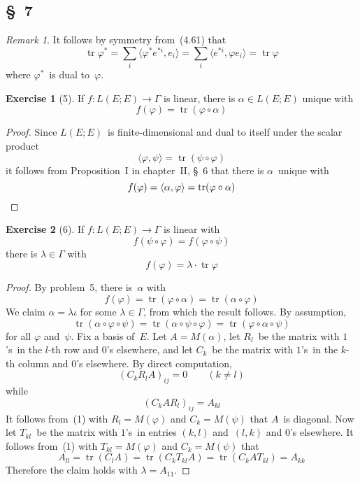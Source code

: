 \documentclass[letterpaper,12pt]{article}
\DeclareMathOperator{\tr}{tr}
\newcommand{\after}{\circ}
\newcommand{\mult}{\cdot}
\newcommand{\sprod}[2]{\langle#1,#2\rangle}
\theoremstyle{definition}
\newtheorem*{exer}{Exercise}
\theoremstyle{remark}
\newtheorem*{rmk}{Remark}
\begin{document}
\subsection*{\S~7}
\begin{rmk}
It follows by symmetry from~(4.61) that
\[\tr\varphi^*=\sum_i\sprod{\varphi^* e^{*i}}{e_i}=\sum_i\sprod{e^{*i}}{\varphi e_i}=\tr\varphi\]
where \(\varphi^*\)~is dual to~\(\varphi\).
\end{rmk}

\begin{exer}[5]
If \(f:L(E;E)\to\Gamma\) is linear, there is \(\alpha\in L(E;E)\) unique with
\[f(\varphi)=\tr(\varphi\after\alpha)\]
\end{exer}
\begin{proof}
Since \(L(E;E)\)~is finite-dimensional and dual to itself under the scalar product
\[\sprod{\varphi}{\psi}=\tr(\psi\after\varphi)\]
it follows from Proposition~I in chapter~II, \S~6 that there is \(\alpha\)~unique with
\[f(\varphi)=\sprod{\alpha}{\varphi}=\tr(\varphi\after\alpha)\qedhere\]
\end{proof}

\begin{exer}[6]
If \(f:L(E;E)\to\Gamma\) is linear with
\[f(\psi\after\varphi)=f(\varphi\after\psi)\]
there is \(\lambda\in\Gamma\) with
\[f(\varphi)=\lambda\mult\tr\varphi\]
\end{exer}
\begin{proof}
By problem~5, there is~\(\alpha\) with
\[f(\varphi)=\tr(\varphi\after\alpha)=\tr(\alpha\after\varphi)\]
We claim \(\alpha=\lambda\iota\) for some \(\lambda\in\Gamma\), from which the result follows. By assumption,
\[\tr(\alpha\after\varphi\after\psi)=\tr(\alpha\after\psi\after\varphi)=\tr(\varphi\after\alpha\after\psi)\tag{1}\]
for all \(\varphi\) and~\(\psi\). Fix a basis of~\(E\). Let \(A=M(\alpha)\), let \(R_l\)~be the matrix with \(1\)'s~in the \(l\)-th row and \(0\)'s elsewhere, and let \(C_k\)~be the matrix with \(1\)'s~in the \(k\)-th column and \(0\)'s elsewhere. By direct computation,
\[(C_kR_lA)_{ij}=0\qquad(k\ne l)\]
while
\[(C_kAR_l)_{ij}=A_{kl}\]
It follows from~(1) with \(R_l=M(\varphi)\) and \(C_k=M(\psi)\) that \(A\)~is diagonal. Now let \(T_{kl}\)~be the matrix with \(1\)'s~in entries \((k,l)\) and~\((l,k)\) and \(0\)'s elsewhere. It follows from~(1) with \(T_{kl}=M(\varphi)\) and \(C_k=M(\psi)\) that
\[A_{ll}=\tr(C_lA)=\tr(C_kT_{kl}A)=\tr(C_kAT_{kl})=A_{kk}\]
Therefore the claim holds with \(\lambda=A_{11}\).
\end{proof}
\end{document}
